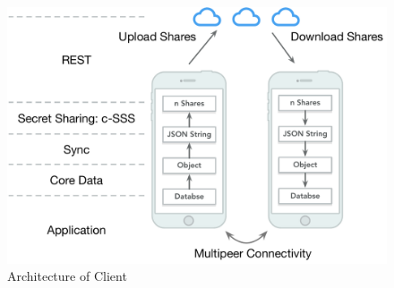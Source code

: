 \documentclass[twocolumn,10pt]{article}
\begin{document}
\begin{figure}[t]
	\centering
	\includegraphics[scale=0.35]{architecture}
	\caption{Architecture of Client}
\end{figure}
\end{document}
